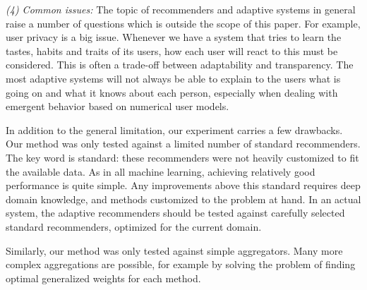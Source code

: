\emph{(4) Common issues:}
The topic of recommenders and adaptive systems in general
raise a number of questions which is outside the scope of this paper.
For example, user privacy is a big issue.
Whenever we have a system that tries to learn the tastes, habits and
traits of its users, how each user will react to this must be considered.
This is often a trade-off between adaptability and transparency.
The most adaptive systems will not always be able to explain to the users
what is going on and what it knows about each person,
especially when dealing with emergent behavior based on 
numerical user models.

In addition to the general limitation, our experiment carries a few drawbacks.
Our method was only tested against a limited number of standard recommenders.
The key word is standard: these recommenders were not heavily customized
to fit the available data. As in all machine learning,
achieving relatively good performance is quite simple.
Any improvements above this standard requires deep domain knowledge,
and methods customized to the problem at hand.
In an actual system, the adaptive recommenders should be tested
against carefully selected standard recommenders,
optimized for the current domain.

Similarly, our method was only tested against simple aggregators.
Many more complex aggregations are possible,
for example by solving the problem of finding
optimal generalized weights for each method.


